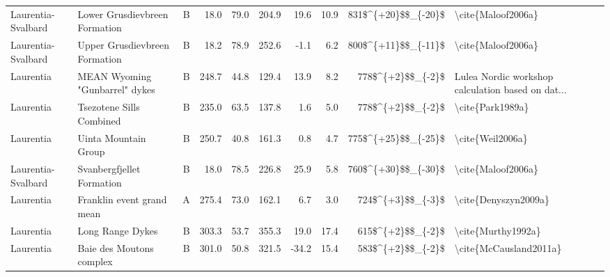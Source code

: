\begin{longtable}{p{1 in}p{1 in}rrrrrrr}
            Laurentia-Svalbard &                      Lower Grusdievbreen Formation &      B &      18.0 &      79.0 & 204.9 &  19.6 &      10.9 &    831\$\textasciicircum \{+20\}\$\$\_\{-20\}\$ &                                 \textbackslash cite\{Maloof2006a\} \\
            Laurentia-Svalbard &                      Upper Grusdievbreen Formation &      B &      18.2 &      78.9 & 252.6 &  -1.1 &       6.2 &    800\$\textasciicircum \{+11\}\$\$\_\{-11\}\$ &                                 \textbackslash cite\{Maloof2006a\} \\
                     Laurentia &                     MEAN Wyoming "Gunbarrel" dykes &      B &     248.7 &      44.8 & 129.4 &  13.9 &       8.2 &      778\$\textasciicircum \{+2\}\$\$\_\{-2\}\$ &  Lulea Nordic workshop calculation based on dat... \\
                     Laurentia &                           Tsezotene Sills Combined &      B &     235.0 &      63.5 & 137.8 &   1.6 &       5.0 &      778\$\textasciicircum \{+2\}\$\$\_\{-2\}\$ &                                   \textbackslash cite\{Park1989a\} \\
                     Laurentia &                               Uinta Mountain Group &      B &     250.7 &      40.8 & 161.3 &   0.8 &       4.7 &    775\$\textasciicircum \{+25\}\$\$\_\{-25\}\$ &                                   \textbackslash cite\{Weil2006a\} \\
            Laurentia-Svalbard &                          Svanbergfjellet Formation &      B &      18.0 &      78.5 & 226.8 &  25.9 &       5.8 &    760\$\textasciicircum \{+30\}\$\$\_\{-30\}\$ &                                 \textbackslash cite\{Maloof2006a\} \\
                     Laurentia &                          Franklin event grand mean &      A &     275.4 &      73.0 & 162.1 &   6.7 &       3.0 &      724\$\textasciicircum \{+3\}\$\$\_\{-3\}\$ &                               \textbackslash cite\{Denyszyn2009a\} \\
                     Laurentia &                                   Long Range Dykes &      B &     303.3 &      53.7 & 355.3 &  19.0 &      17.4 &      615\$\textasciicircum \{+2\}\$\$\_\{-2\}\$ &                                 \textbackslash cite\{Murthy1992a\} \\
                     Laurentia &                           Baie des Moutons complex &      B &     301.0 &      50.8 & 321.5 & -34.2 &      15.4 &      583\$\textasciicircum \{+2\}\$\$\_\{-2\}\$ &                             \textbackslash cite\{McCausland2011a\} \\

\end{longtable}
